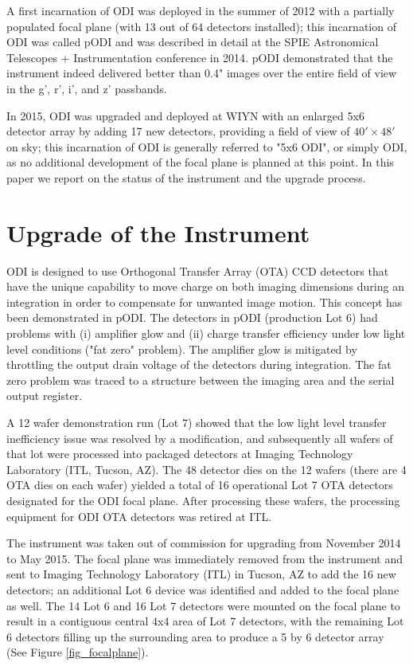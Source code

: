 \documentclass[]{spieman}
\begin{document}
A first incarnation of ODI was deployed in the summer of 2012 with a partially
populated focal plane (with 13 out of 64 detectors installed); this incarnation
of ODI was called pODI and was described in detail at the SPIE Astronomical
Telescopes + Instrumentation conference in 2014\cite{harbeck2014}. pODI
demonstrated that the instrument indeed delivered better than 0.4" images over
the entire field of view in the g', r', i', and z' passbands.

In 2015, ODI was upgraded and deployed at WIYN  with an enlarged 5x6  detector
array by adding 17 new detectors, providing a field of view of $40' \times 48'$
on sky; this incarnation  of ODI is generally  referred to "5x6 ODI", or simply
ODI, as no additional development of the focal plane is planned at this point.
In this paper we report on the status of the instrument and the upgrade process.


\section{Upgrade of the Instrument} 

ODI is designed to use Orthogonal Transfer Array (OTA) CCD detectors that have
the unique capability to move charge on both imaging dimensions during an
integration in order to compensate for unwanted image motion. This concept has
been demonstrated in pODI.  The detectors in pODI (production Lot 6) had
problems with (i) amplifier glow and (ii)  charge transfer efficiency under low
light level conditions ("fat zero" problem). The amplifier glow is mitigated by
throttling the output drain voltage of the detectors during integration. The fat
zero problem was traced to a structure between the imaging area and the serial
output register.

A  12 wafer demonstration run (Lot 7)  showed that the low light level transfer
inefficiency issue was resolved by a modification\cite{harbeck2014}, and subsequently
all
wafers of that lot were processed into packaged detectors at Imaging
Technology Laboratory (ITL, Tucson, AZ). The  48 detector dies on the 12 wafers 
(there are 4 OTA dies on each wafer) yielded a total of 16 operational Lot 7 
OTA detectors designated for the ODI focal plane. After processing
these wafers, the processing equipment for ODI OTA detectors was retired at
ITL.

The instrument was taken out of commission for upgrading from November 2014 to
May 2015. The focal plane was immediately removed from the instrument and sent
to  Imaging Technology Laboratory  (ITL) in Tucson, AZ to add the 16 new
detectors; an additional Lot 6 device was identified and added to the focal
plane as well. The 14 Lot 6 and 16 Lot 7 detectors were mounted on the focal
plane to result in a contiguous central 4x4 area of Lot 7 detectors, with the remaining
Lot 6 detectors filling up the surrounding area to produce a 5 by 6 detector array 
(See Figure \ref{fig_focalplane}).
\end{document}
